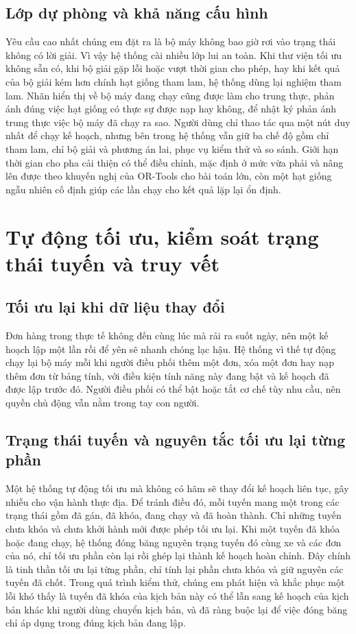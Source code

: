 \documentclass[12pt,a4paper,oneside]{report}
\begin{document}
\section{Lớp dự phòng và khả năng cấu hình}
Yêu cầu cao nhất chúng em đặt ra là bộ máy không bao giờ rơi vào trạng thái không có lời giải. Vì vậy hệ thống cài nhiều lớp lui an toàn. Khi thư viện tối ưu không sẵn có, khi bộ giải gặp lỗi hoặc vượt thời gian cho phép, hay khi kết quả của bộ giải kém hơn chính hạt giống tham lam, hệ thống dùng lại nghiệm tham lam. Nhãn hiển thị về bộ máy đang chạy cũng được làm cho trung thực, phản ánh đúng việc hạt giống có thực sự được nạp hay không, để nhật ký phản ánh trung thực việc bộ máy đã chạy ra sao. Người dùng chỉ thao tác qua một nút duy nhất để chạy kế hoạch, nhưng bên trong hệ thống vẫn giữ ba chế độ gồm chỉ tham lam, chỉ bộ giải và phương án lai, phục vụ kiểm thử và so sánh. Giới hạn thời gian cho pha cải thiện có thể điều chỉnh, mặc định ở mức vừa phải và nâng lên được theo khuyến nghị của OR-Tools cho bài toán lớn, còn một hạt giống ngẫu nhiên cố định giúp các lần chạy cho kết quả lặp lại ổn định.

\chapter{Tự động tối ưu, kiểm soát trạng thái tuyến và truy vết}

\section{Tối ưu lại khi dữ liệu thay đổi}
Đơn hàng trong thực tế không đến cùng lúc mà rải ra suốt ngày, nên một kế hoạch lập một lần rồi để yên sẽ nhanh chóng lạc hậu. Hệ thống vì thế tự động chạy lại bộ máy mỗi khi người điều phối thêm một đơn, xóa một đơn hay nạp thêm đơn từ bảng tính, với điều kiện tính năng này đang bật và kế hoạch đã được lập trước đó. Người điều phối có thể bật hoặc tắt cơ chế tùy nhu cầu, nên quyền chủ động vẫn nằm trong tay con người.

\section{Trạng thái tuyến và nguyên tắc tối ưu lại từng phần}
Một hệ thống tự động tối ưu mà không có hãm sẽ thay đổi kế hoạch liên tục, gây nhiễu cho vận hành thực địa. Để tránh điều đó, mỗi tuyến mang một trong các trạng thái gồm đã gán, đã khóa, đang chạy và đã hoàn thành. Chỉ những tuyến chưa khóa và chưa khởi hành mới được phép tối ưu lại. Khi một tuyến đã khóa hoặc đang chạy, hệ thống đóng băng nguyên trạng tuyến đó cùng xe và các đơn của nó, chỉ tối ưu phần còn lại rồi ghép lại thành kế hoạch hoàn chỉnh. Đây chính là tinh thần tối ưu lại từng phần, chỉ tính lại phần chưa khóa và giữ nguyên các tuyến đã chốt. Trong quá trình kiểm thử, chúng em phát hiện và khắc phục một lỗi khó thấy là tuyến đã khóa của kịch bản này có thể lẫn sang kế hoạch của kịch bản khác khi người dùng chuyển kịch bản, và đã ràng buộc lại để việc đóng băng chỉ áp dụng trong đúng kịch bản đang lập.
\end{document}

